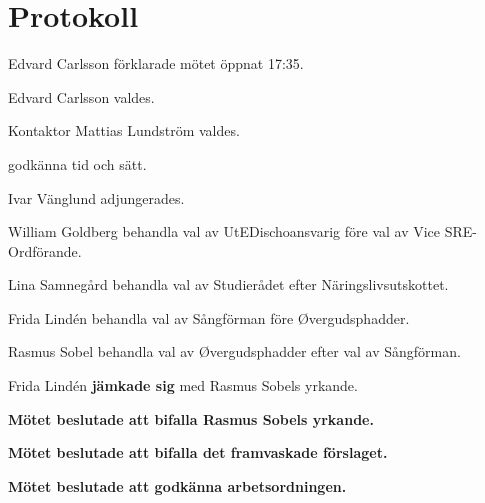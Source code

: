 \documentclass[10pt]{article}
\def\mo{Edvard Carlsson}
\def\ms{Mattias Lundström}
\begin{document}
\newpage

\section*{Protokoll}
\begin{paragrafer}
{\mo} förklarade mötet öppnat 17:35.


{\mo} valdes.

Kontaktor {\ms} valdes.


\Mba godkänna tid och sätt.


\valavj

Ivar Vänglund adjungerades.




William Goldberg \ypa behandla val av UtEDischoansvarig före val av Vice SRE-Ordförande. 

\textbf{\Mbaby}

Lina Samnegård \ypa behandla val av Studierådet efter Näringslivsutskottet.

\textbf{\Mbaby}

Frida Lindén \ypa behandla val av Sångförman före Øvergudsphadder.

Rasmus Sobel \ypa behandla val av Øvergudsphadder efter val av Sångförman. 

Frida Lindén \textbf{jämkade sig} med Rasmus Sobels yrkande. 

\textbf{Mötet beslutade att bifalla Rasmus Sobels yrkande.}

\textbf{Mötet beslutade att bifalla det framvaskade förslaget.}


\textbf{Mötet beslutade att godkänna arbetsordningen.}


\end{paragrafer}
\end{document}
